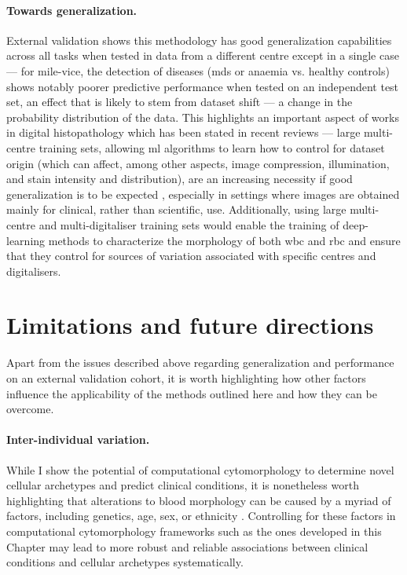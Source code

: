 \paragraph{Towards generalization.} External validation shows this methodology has good generalization capabilities across all tasks when tested in data from a different centre except in a single case --- for \ac{mile-vice}, the detection of diseases (\ac{mds} or anaemia vs. healthy controls) shows notably poorer predictive performance when tested on an independent test set, an effect that is likely to stem from dataset shift --- a change in the probability distribution of the data. This highlights an important aspect of works in digital histopathology which has been stated in recent reviews --- large multi-centre training sets, allowing \ac{ml} algorithms to learn how to control for dataset origin (which can affect, among other aspects, image compression, illumination, and stain intensity and distribution), are an increasing necessity if good generalization is to be expected \cite{Van_der_Laak2021-id}, especially in settings where images are obtained mainly for clinical, rather than scientific, use. Additionally, using large multi-centre and multi-digitaliser training sets would enable the training of deep-learning methods to characterize the morphology of both \ac{wbc} and \ac{rbc} and ensure that they control for sources of variation associated with specific centres and digitalisers. 

\section{Limitations and future directions}

Apart from the issues described above regarding generalization and performance on an external validation cohort, it is worth highlighting how other factors influence the applicability of the methods outlined here and how they can be overcome.

\paragraph{Inter-individual variation.} While I show the potential of computational cytomorphology to determine novel cellular archetypes and predict clinical conditions, it is nonetheless worth highlighting that alterations to blood morphology can be caused by a myriad of factors, including genetics, age, sex, or ethnicity \cite{Bain2014-oc,Hellstrom_Lindberg2015-zs,Lorey1996-yc}. Controlling for these factors in computational cytomorphology frameworks such as the ones developed in this Chapter may lead to more robust and reliable associations between clinical conditions and cellular archetypes systematically.

